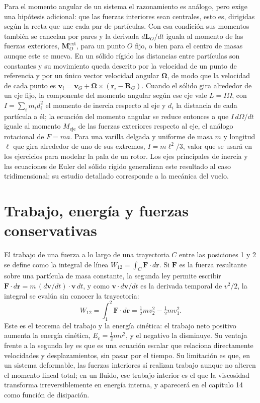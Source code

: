 \documentclass[10pt,openany]{book}
\begin{document}
Para el momento angular de un sistema el razonamiento es análogo, pero exige una hipótesis adicional: que las fuerzas interiores sean centrales, esto es, dirigidas según la recta que une cada par de partículas. Con esa condición sus momentos también se cancelan por pares y la derivada \(d\mathbf{L}_O/dt\) iguala al momento de las fuerzas exteriores, \(\mathbf{M}_O^{\mathrm{ext}}\), para un punto \(O\) fijo, o bien para el centro de masas aunque este se mueva. En un sólido rígido las distancias entre partículas son constantes y su movimiento queda descrito por la velocidad de un punto de referencia y por un único vector velocidad angular \(\boldsymbol{\Omega}\), de modo que la velocidad de cada punto es \(\mathbf{v}_i = \mathbf{v}_G + \boldsymbol{\Omega}\times(\mathbf{r}_i - \mathbf{R}_G)\). Cuando el sólido gira alrededor de un eje fijo, la componente del momento angular según ese eje vale \(L = I\Omega\), con \(I = \sum_i m_i d_i^{2}\) el momento de inercia respecto al eje y \(d_i\) la distancia de cada partícula a él; la ecuación del momento angular se reduce entonces a que \(I\,d\Omega/dt\) iguale al momento \(M_{\mathrm{eje}}\) de las fuerzas exteriores respecto al eje, el análogo rotacional de \(F = ma\). Para una varilla delgada y uniforme de masa \(m\) y longitud \(\ell\) que gira alrededor de uno de sus extremos, \(I = m\ell^{2}/3\), valor que se usará en los ejercicios para modelar la pala de un rotor. Los ejes principales de inercia y las ecuaciones de Euler del sólido rígido generalizan este resultado al caso tridimensional; su estudio detallado corresponde a la mecánica del vuelo.

\section{Trabajo, energía y fuerzas conservativas}

El trabajo de una fuerza a lo largo de una trayectoria \(C\) entre las posiciones 1 y 2 se define como la integral de línea \(W_{12} = \int_C \mathbf{F}\cdot d\mathbf{r}\). Si \(\mathbf{F}\) es la fuerza resultante sobre una partícula de masa constante, la segunda ley permite escribir \(\mathbf{F}\cdot d\mathbf{r} = m\,(d\mathbf{v}/dt)\cdot\mathbf{v}\,dt\), y como \(\mathbf{v}\cdot d\mathbf{v}/dt\) es la derivada temporal de \(v^{2}/2\), la integral se evalúa sin conocer la trayectoria:
\begin{equation}
W_{12} = \int_{1}^{2}\mathbf{F}\cdot d\mathbf{r} = \tfrac{1}{2}m v_2^{2} - \tfrac{1}{2}m v_1^{2}. \label{eq:c01-tte}
\end{equation}
Este es el teorema del trabajo y la energía cinética: el trabajo neto positivo aumenta la energía cinética, \(E_c = \tfrac12 m v^{2}\), y el negativo la disminuye. Su ventaja frente a la segunda ley es que es una ecuación escalar que relaciona directamente velocidades y desplazamientos, sin pasar por el tiempo. Su limitación es que, en un sistema deformable, las fuerzas interiores sí realizan trabajo aunque no alteren el momento lineal total; en un fluido, ese trabajo interior es el que la viscosidad transforma irreversiblemente en energía interna, y aparecerá en el capítulo 14 como función de disipación.
\end{document}
